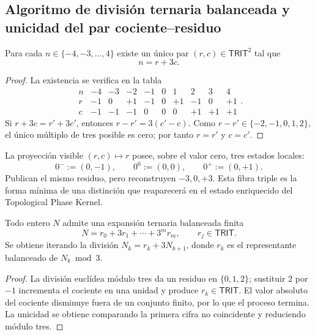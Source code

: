 \subsection{Algoritmo de división ternaria balanceada y unicidad del par cociente–residuo}

\begin{theorem}
\label{p12-83-c1-s11:thm:trit-levantamiento-local}
Para cada \(n\in\{-4,-3,\ldots,4\}\) existe un único par
\((r,c)\in\mathsf{TRIT}^2\) tal que
\[
 n=r+3c.
\]
\end{theorem}

\begin{proof}
La existencia se verifica en la tabla
\[
\begin{array}{c|rrrrrrrrr}
n&-4&-3&-2&-1&0&1&2&3&4\\\hline
r&-1&0&+1&-1&0&+1&-1&0&+1\\
c&-1&-1&-1&0&0&0&+1&+1&+1
\end{array}.
\]
Si \(r+3c=r'+3c'\), entonces \(r-r'=3(c'-c)\). Como
\(r-r'\in\{-2,-1,0,1,2\}\), el único múltiplo de tres posible es cero;
por tanto \(r=r'\) y \(c=c'\).
\end{proof}

La proyección visible \((r,c)\mapsto r\) posee, sobre el valor cero, tres
estados locales:
\[
 0^-:=(0,-1),
 \qquad
 0^0:=(0,0),
 \qquad
 0^+:=(0,+1).
\]
Publican el mismo residuo, pero reconstruyen \(-3,0,+3\). Esta fibra triple
es la forma mínima de una distinción que reaparecerá en el estado enriquecido
del Topological Phase Kernel.

\begin{corollary}
\label{p12-83-c1-s11:cor:trit-iteracion-balanceada}
Todo entero \(N\) admite una expansión ternaria balanceada finita
\[
 N=r_0+3r_1+\cdots+3^mr_m,
 \qquad r_j\in\mathsf{TRIT}.
\]
Se obtiene iterando la división \(N_k=r_k+3N_{k+1}\), donde \(r_k\) es el
representante balanceado de \(N_k\bmod3\).
\end{corollary}

\begin{proof}
La división euclídea módulo tres da un residuo en \(\{0,1,2\}\); sustituir
\(2\) por \(-1\) incrementa el cociente en una unidad y produce
\(r_k\in\mathsf{TRIT}\). El valor absoluto del cociente disminuye fuera de
un conjunto finito, por lo que el proceso termina. La unicidad se obtiene
comparando la primera cifra no coincidente y reduciendo módulo tres.
\end{proof}

